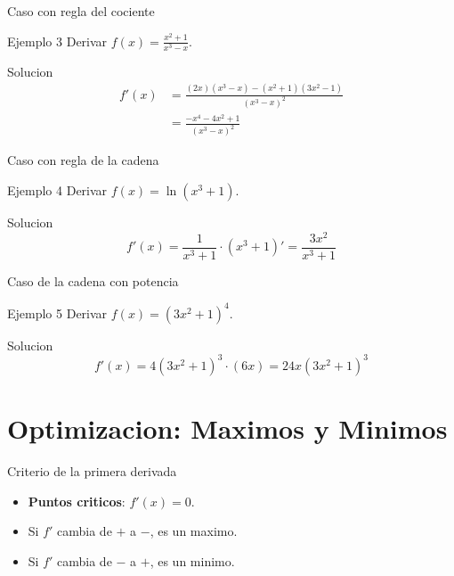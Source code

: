 \documentclass[aspectratio=169, 10pt, xcolor=table]{beamer}
\begin{document}
\begin{frame}{Caso con regla del cociente}
    \begin{exampleblock}{Ejemplo 3}
        Derivar $f(x) = \frac{x^2+1}{x^3-x}$.
    \end{exampleblock}
    \begin{block}{Solucion}
        \begin{align*}
            f'(x) &= \frac{(2x)(x^3-x) - (x^2+1)(3x^2-1)}{(x^3-x)^2} \\
            &= \frac{-x^4 -4x^2 +1}{(x^3-x)^2}
        \end{align*}
    \end{block}
\end{frame}

\begin{frame}{Caso con regla de la cadena}
    \begin{exampleblock}{Ejemplo 4}
        Derivar $f(x) = \ln(x^3+1)$.
    \end{exampleblock}
    \begin{block}{Solucion}
        \[
        f'(x) = \frac{1}{x^3+1} \cdot (x^3+1)' = \frac{3x^2}{x^3+1}
        \]
    \end{block}
\end{frame}

\begin{frame}{Caso de la cadena con potencia}
    \begin{exampleblock}{Ejemplo 5}
        Derivar $f(x) = (3x^2+1)^4$.
    \end{exampleblock}
    \begin{block}{Solucion}
        \[
        f'(x) = 4(3x^2+1)^3 \cdot (6x) = 24x(3x^2+1)^3
        \]
    \end{block}
\end{frame}

\section{Optimizacion: Maximos y Minimos}

\begin{frame}{Criterio de la primera derivada}
    \begin{itemize}
        \item \textbf{Puntos criticos}: $f'(x)=0$.
        \item Si $f'$ cambia de $+$ a $-$, es un maximo.
        \item Si $f'$ cambia de $-$ a $+$, es un minimo.
    \end{itemize}
\end{frame}
\end{document}
